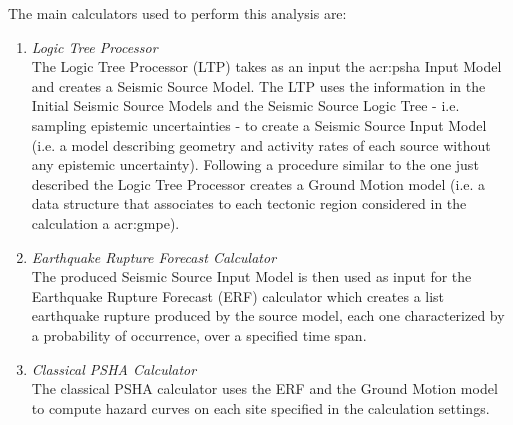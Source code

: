 The main calculators used to perform this analysis are:
\begin{enumerate}
\item \emph{Logic Tree Processor} \hfill \\
The Logic Tree Processor (LTP) takes as an input the \gls{acr:psha} 
Input Model and creates a Seismic Source Model. The LTP uses the 
information in the Initial Seismic Source Models and  
the Seismic Source Logic Tree - i.e. sampling 
epistemic uncertainties - to create a Seismic Source Input
Model (i.e. a model describing geometry and activity rates of each 
source without any epistemic uncertainty). 
%
Following a procedure similar to the one just described the Logic Tree Processor creates a Ground Motion model (i.e. a data structure that associates to each tectonic region considered in the calculation a \gls{acr:gmpe}).
%
\item \emph{Earthquake Rupture Forecast Calculator} \hfill \\
The produced Seismic Source Input Model is then used as input for the
Earthquake Rupture Forecast (ERF) calculator which creates a list 
earthquake rupture produced by the source model, each one characterized
by a probability of occurrence, over a specified time span.
\item \emph{Classical PSHA Calculator} \hfill \\
The classical PSHA calculator uses the ERF and the Ground Motion model 
to compute hazard curves on each site specified in the calculation settings.
\end{enumerate} 
%
